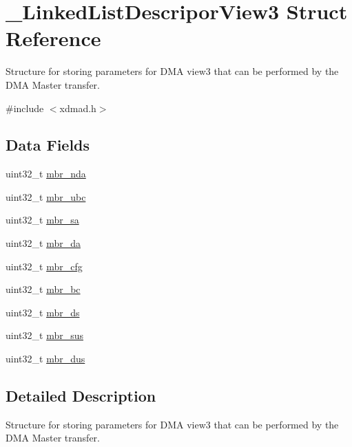 \hypertarget{struct__LinkedListDescriporView3}{}\section{\+\_\+\+Linked\+List\+Descripor\+View3 Struct Reference}
\label{struct__LinkedListDescriporView3}


Structure for storing parameters for D\+MA view3 that can be performed by the D\+MA Master transfer.  




{\ttfamily \#include $<$xdmad.\+h$>$}

\subsection*{Data Fields}
\begin{DoxyCompactItemize}
\item 
uint32\+\_\+t \mbox{\hyperlink{struct__LinkedListDescriporView3_a3fa6aae4b08594eec10f02f78dfd1d34}{mbr\+\_\+nda}}
\item 
uint32\+\_\+t \mbox{\hyperlink{struct__LinkedListDescriporView3_ae66959e325f6cfd8b3f2c73391d66321}{mbr\+\_\+ubc}}
\item 
uint32\+\_\+t \mbox{\hyperlink{struct__LinkedListDescriporView3_a57f58819957cce3b72797e2b27d4617f}{mbr\+\_\+sa}}
\item 
uint32\+\_\+t \mbox{\hyperlink{struct__LinkedListDescriporView3_afeab71b616af7a70304e68561ee7a9ce}{mbr\+\_\+da}}
\item 
uint32\+\_\+t \mbox{\hyperlink{struct__LinkedListDescriporView3_a14e5d7a88013e27fa0874c6e283635e3}{mbr\+\_\+cfg}}
\item 
uint32\+\_\+t \mbox{\hyperlink{struct__LinkedListDescriporView3_a8175500500fc2709f032aa2b35c750ea}{mbr\+\_\+bc}}
\item 
uint32\+\_\+t \mbox{\hyperlink{struct__LinkedListDescriporView3_a55a9b84e588d06e4b0d1864c07ef9a8e}{mbr\+\_\+ds}}
\item 
uint32\+\_\+t \mbox{\hyperlink{struct__LinkedListDescriporView3_a5ed9008a4b6636e425a188576f33bbcf}{mbr\+\_\+sus}}
\item 
uint32\+\_\+t \mbox{\hyperlink{struct__LinkedListDescriporView3_a36de3ea23e4be0084f0cff984b03ba4c}{mbr\+\_\+dus}}
\end{DoxyCompactItemize}


\subsection{Detailed Description}
Structure for storing parameters for D\+MA view3 that can be performed by the D\+MA Master transfer. 


